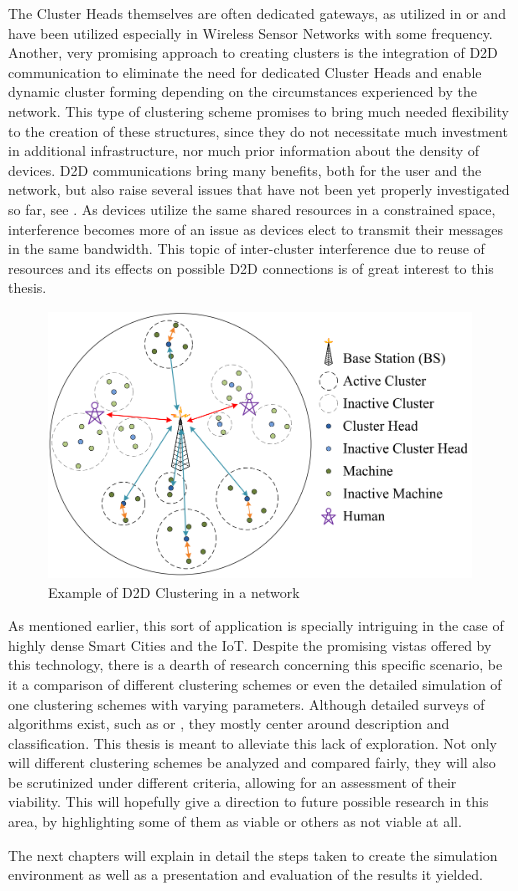 The Cluster Heads themselves are often dedicated gateways, as utilized in \cite{Niyato2011} or \cite{Shariatmadari2015} and have been utilized especially in Wireless Sensor Networks with some frequency. Another, very promising approach to creating clusters is the integration of D2D communication to eliminate the need for dedicated Cluster Heads and enable dynamic cluster forming depending on the circumstances experienced by the network. This type of clustering scheme promises to bring much needed flexibility to the creation of these structures, since they do not necessitate much investment in additional infrastructure, nor much prior information about the density of devices. D2D communications bring many benefits, both for the user and the network, but also raise several issues that have not been yet properly investigated so far, see \cite{Klugel2014}. As devices utilize the same shared resources in a constrained space, interference becomes more of an issue as devices elect to transmit their messages in the same bandwidth. This topic of inter-cluster interference due to reuse of resources and its effects on possible D2D connections is of great interest to this thesis. 

\begin{figure}[H]
\centering
\includegraphics[scale = 0.25]{figures/D2D_clustering}
\caption{Example of D2D Clustering in a network \cite{Wang2013}}
\end{figure}

As mentioned earlier, this sort of application is specially intriguing in the case of highly dense Smart Cities and the IoT. Despite the promising vistas offered by this technology, there is a dearth of research concerning this specific scenario, be it a comparison of different clustering schemes or even the detailed simulation of one clustering schemes with varying parameters. Although detailed surveys of algorithms exist, such as \cite{Jiang2009} or \cite{Afsar2014}, they mostly center around description and classification. This thesis is meant to alleviate this lack of exploration. Not only will different clustering schemes be analyzed and compared fairly, they will also be scrutinized under different criteria, allowing for an assessment of their viability. This will hopefully give a direction to future possible research in this area, by highlighting some of them as viable or others as not viable at all.


The next chapters will explain in detail the steps taken to create the simulation environment as well as a presentation and evaluation of the results it yielded.